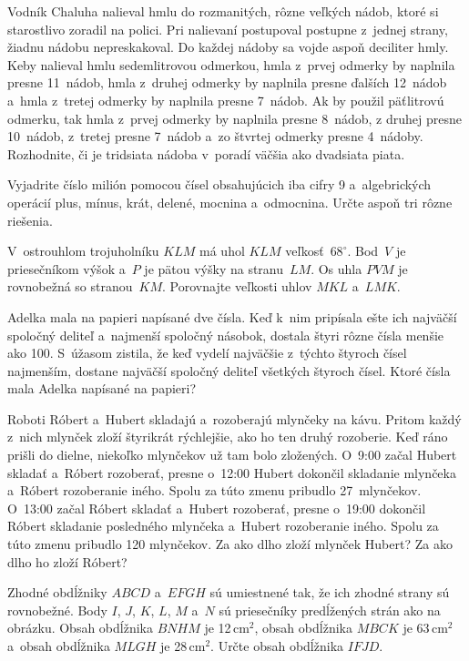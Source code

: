 {%
Vodník Chaluha nalieval hmlu do rozmanitých, rôzne veľkých nádob, ktoré si starostlivo zoradil na polici.
Pri nalievaní postupoval postupne z~jednej strany, žiadnu nádobu nepreskakoval.
Do každej nádoby sa vojde aspoň deciliter hmly.
Keby nalieval hmlu sedemlitrovou odmerkou, hmla z~prvej odmerky by naplnila presne 11~nádob, hmla z~druhej odmerky by naplnila presne ďalších 12~nádob a~hmla z~tretej odmerky by naplnila presne 7~nádob.
Ak by použil päťlitrovú odmerku, tak hmla z~prvej odmerky by naplnila presne 8~nádob, z druhej presne 10~nádob, z~tretej presne 7~nádob a~zo štvrtej odmerky presne 4~nádoby.
Rozhodnite, či je tridsiata nádoba v~poradí väčšia ako dvadsiata piata.}

{%
Vyjadrite číslo milión pomocou čísel obsahujúcich iba cifry 9 a~algebrických operácií plus, mínus, krát, delené, mocnina a~odmocnina.
Určte aspoň tri rôzne riešenia.}

{%
V~ostrouhlom trojuholníku $KLM$ má uhol $KLM$ veľkosť~$68^\circ$.
Bod~$V$ je priesečníkom výšok a~$P$ je pätou výšky na stranu~$LM$.
Os uhla $PVM$ je rovnobežná so stranou~$KM$.
Porovnajte veľkosti uhlov $MKL$ a~$LMK$.
}

{%
Adelka mala na papieri napísané dve čísla.
Keď k~nim pripísala ešte ich najväčší spoločný deliteľ a~najmenší spoločný násobok, dostala štyri rôzne čísla menšie ako 100.
S~úžasom zistila, že keď vydelí najväčšie z~týchto štyroch čísel najmenším, dostane najväčší spoločný deliteľ všetkých štyroch čísel.
Ktoré čísla mala Adelka napísané na papieri?}

{%
Roboti Róbert a~Hubert skladajú a~rozoberajú mlynčeky na kávu.
Pritom každý z~nich mlynček zloží štyrikrát rýchlejšie, ako ho ten druhý rozoberie.
Keď ráno prišli do dielne, niekoľko mlynčekov už tam bolo zložených.
O~9:00 začal Hubert skladať a~Róbert rozoberať, presne o~12:00 Hubert dokončil skladanie mlynčeka a~Róbert rozoberanie iného.
Spolu za túto zmenu pribudlo 27~mlynčekov.
O~13:00 začal Róbert skladať a~Hubert rozoberať, presne o~19:00 dokončil Róbert skladanie posledného mlynčeka a~Hubert rozoberanie iného.
Spolu za túto zmenu pribudlo 120 mlynčekov.
Za ako dlho zloží mlynček Hubert?
Za ako dlho ho zloží Róbert?
}

{%
Zhodné obdĺžniky $ABCD$ a~$EFGH$ sú umiestnené tak, že ich zhodné strany sú rovnobežné.
Body $I$, $J$, $K$, $L$, $M$ a~$N$ sú priesečníky predĺžených strán ako na obrázku.
Obsah obdĺžnika $BNHM$ je 12\,cm$^2$, obsah obdĺžnika $MBCK$ je 63\,cm$^2$ a~obsah obdĺžnika $MLGH$ je 28\,cm$^2$.
Určte obsah obdĺžnika $IFJD$.
%
}

